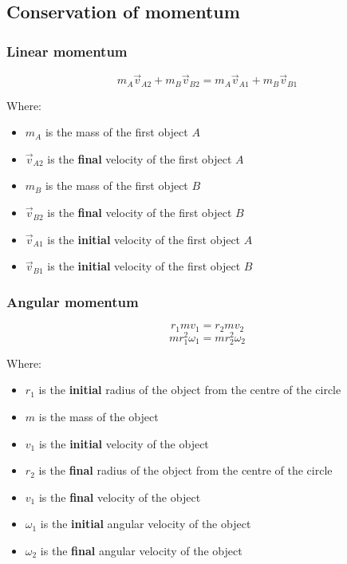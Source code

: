 \documentclass[11pt]{article}
\begin{document}
\subsection{Conservation of momentum}
\label{sec:org97e81f6}

\subsubsection{Linear momentum}
\label{sec:org0032a54}
\[m_A \vec{v}_{A2} + m_B \vec{v}_{B2} = m_A \vec{v}_{A1} + m_B \vec{v}_{B1}\]

Where:
\begin{itemize}
\item \(m_A\) is the mass of the first object \(A\)
\item \(\vec{v}_{A2}\) is the \textbf{final} velocity of the first object \(A\)
\item \(m_B\) is the mass of the first object \(B\)
\item \(\vec{v}_{B2}\) is the \textbf{final} velocity of the first object \(B\)
\item \(\vec{v}_{A1}\) is the \textbf{initial} velocity of the first object \(A\)
\item \(\vec{v}_{B1}\) is the \textbf{initial} velocity of the first object \(B\)
\end{itemize}

 \newpage
\subsubsection{Angular momentum}
\label{sec:org11c977f}
\[r_1 mv_1 = r_2 m v_2\]
\[m r_1^2 \omega_1 = m r_2^2 \omega_2\]

Where:
\begin{itemize}
\item \(r_1\) is the \textbf{initial} radius of the object from the centre of the circle
\item \(m\) is the mass of the object
\item \(v_1\) is the \textbf{initial} velocity of the object
\item \(r_2\) is the \textbf{final} radius of the object from the centre of the circle
\item \(v_1\) is the \textbf{final} velocity of the object
\item \(\omega_1\) is the \textbf{initial} angular velocity of the object
\item \(\omega_2\) is the \textbf{final} angular velocity of the object
\end{itemize}
\end{document}
